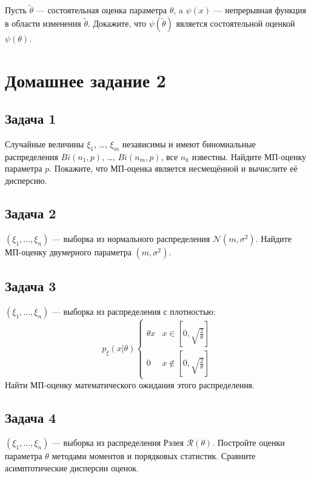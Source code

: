 \documentclass[a4paper,12pt]{article}
\begin{document}
Пусть $\widetilde{\theta}$ --- состоятельная оценка параметра $\theta$, a $\psi(x)$ --- непрерывная функция в области изменения $\widetilde{\theta}$.
Докажите, что $\psi(\widetilde{\theta})$ является состоятельной оценкой $\psi(\theta)$.

\section*{Домашнее задание 2}

\subsection*{Задача 1 \cite[124]{Efimov}}

Случайные величины $\xi_1$, \dots, $\xi_m$ независимы и имеют биномиальные распределения $Bi(n_1, p)$, \dots, $Bi(n_m, p)$, все $n_k$ известны.
Найдите МП-оценку параметра $p$. Покажите, что МП-оценка является несмещённой и вычислите её дисперсию.

\subsection*{Задача 2}

$\left( \xi_1, \dots, \xi_n \right)$ --- выборка из нормального распределения $\mathcal{N} \left( m, \sigma^2 \right)$. Найдите МП-оценку двумерного
параметра $\left( m, \sigma^2 \right)$.

\subsection*{Задача 3 \cite[126]{Efimov}}

$\left( \xi_1, \dots, \xi_n \right)$ --- выборка из распределения с плотностью:
\[
    p_\xi(x|\theta)
    \left\{
    \begin{array}{ll}
        \theta x & x \in \left[ 0, \sqrt{\frac{2}{\theta}}\right]    \\
        0        & x \notin \left[ 0, \sqrt{\frac{2}{\theta}}\right]
    \end{array}
    \right.
\]
Найти МП-оценку математического ожидания этого распределения.

\subsection*{Задача 4}

$\left( \xi_1, \dots, \xi_n \right)$ --- выборка из распределения Рэлея $\mathcal{R}(\theta)$. Постройте оценки параметра $\theta$ методами моментов
и порядковых статистик. Сравните асимптотические дисперсии оценок.
\end{document}
